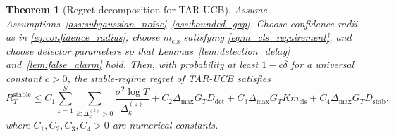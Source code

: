 \documentclass[11pt]{article}
\newtheorem{theorem}{Theorem}
\begin{document}
\begin{theorem}[Regret decomposition for TAR-UCB]
\label{thm:main_regret}
Assume Assumptions~\ref{ass:subgaussian_noise}--\ref{ass:bounded_gap}. Choose confidence radii as in \eqref{eq:confidence_radius}, choose $m_{\mathrm{cls}}$ satisfying \eqref{eq:m_cls_requirement}, and choose detector parameters so that Lemmas~\ref{lem:detection_delay} and~\ref{lem:false_alarm} hold. Then, with probability at least $1-c\delta$ for a universal constant $c>0$, the stable-regime regret of TAR-UCB satisfies
\begin{equation}
\label{eq:main_regret_bound}
R_T^{\mathrm{stable}}
\leq
C_1
\sum_{z=1}^{S}
\sum_{k:\Delta_k^{(z)}>0}
\frac{\sigma^2\log T}{\Delta_k^{(z)}}
+
C_2\Delta_{\max}G_TD_{\mathrm{det}}
+
C_3\Delta_{\max}G_TK m_{\mathrm{cls}}
+
C_4\Delta_{\max}G_TD_{\mathrm{stab}},
\end{equation}
where $C_1,C_2,C_3,C_4>0$ are numerical constants.
\end{theorem}
\end{document}
